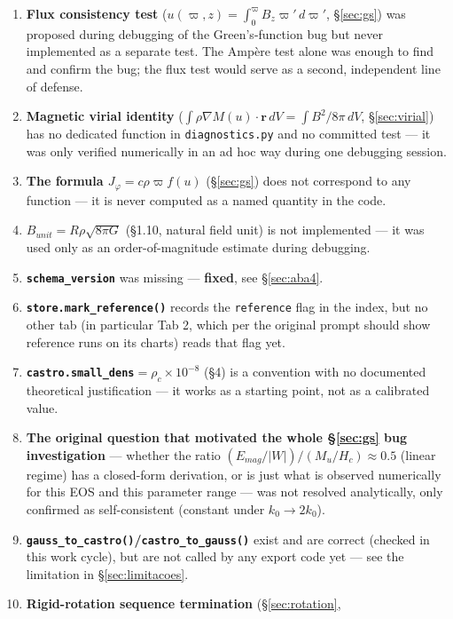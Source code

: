 \documentclass[11pt,a4paper]{scrartcl}
\newcommand{\code}[1]{\texttt{\small #1}}
\begin{document}
\begin{enumerate}[leftmargin=1.6em,itemsep=0.35em]
\item \textbf{Flux consistency test}
  ($u(\varpi,z)=\int_0^\varpi B_z\varpi'\,d\varpi'$, \S\ref{sec:gs}) was
  proposed during debugging of the Green's-function bug but never
  implemented as a separate test. The Ampère test alone was enough to
  find and confirm the bug; the flux test would serve as a second,
  independent line of defense.
\item \textbf{Magnetic virial identity}
  ($\int\rho\nabla M(u)\cdot\mathbf{r}\,dV=\int B^2/8\pi\,dV$,
  \S\ref{sec:virial}) has no dedicated function in \code{diagnostics.py}
  and no committed test --- it was only verified numerically in an ad
  hoc way during one debugging session.
\item \textbf{The formula $J_\varphi=c\rho\varpi f(u)$} (\S\ref{sec:gs})
  does not correspond to any function --- it is never computed as a
  named quantity in the code.
\item \textbf{$B_{unit}=R\rho\sqrt{8\pi G}$} (\S1.10, natural field unit)
  is not implemented --- it was used only as an order-of-magnitude
  estimate during debugging.
\item \textbf{\code{schema\_version}} was missing --- \textbf{fixed}, see
  \S\ref{sec:aba4}.
\item \textbf{\code{store.mark\_reference()}} records the
  \code{reference} flag in the index, but no other tab (in particular
  Tab 2, which per the original prompt should show reference runs on its
  charts) reads that flag yet.
\item \textbf{\code{castro.small\_dens}$=\rho_c\times10^{-8}$} (\S4) is a
  convention with no documented theoretical justification --- it works
  as a starting point, not as a calibrated value.
\item \textbf{The original question that motivated the whole
  \S\ref{sec:gs} bug investigation} --- whether the ratio
  $(E_{mag}/|W|)/(M_u/H_c)\approx0.5$ (linear regime) has a closed-form
  derivation, or is just what is observed numerically for this EOS and
  this parameter range --- was not resolved analytically, only
  confirmed as self-consistent (constant under $k_0\to2k_0$).
\item \textbf{\code{gauss\_to\_castro()}/\code{castro\_to\_gauss()}}
  exist and are correct (checked in this work cycle), but are not called
  by any export code yet --- see the limitation in
  \S\ref{sec:limitacoes}.
\item \textbf{Rigid-rotation sequence termination} (\S\ref{sec:rotation},

\end{enumerate}
\end{document}
